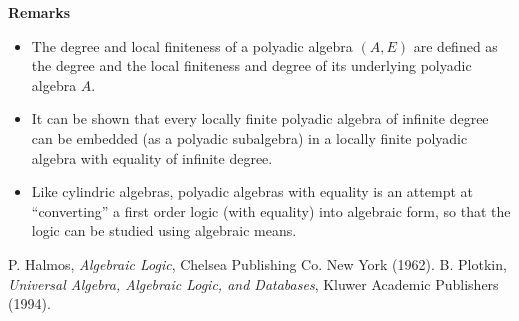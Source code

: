 \documentclass[12pt]{article}
\begin{document}
\textbf{Remarks}
\begin{itemize}
\item The degree and local finiteness of a polyadic algebra $(A,E)$ are defined as the degree and the local finiteness and degree of its underlying polyadic algebra $A$.
\item It can be shown that every locally finite polyadic algebra of infinite degree can be embedded (as a polyadic subalgebra) in a locally finite polyadic algebra with equality of infinite degree.
\item Like cylindric algebras, polyadic algebras with equality is an attempt at ``converting'' a first order logic (with equality) into algebraic form, so that the logic can be studied using algebraic means.
\end{itemize}

\begin{thebibliography}{8}
 P. Halmos, \emph{Algebraic Logic}, Chelsea Publishing Co. New York (1962).
 B. Plotkin, \emph{Universal Algebra, Algebraic Logic, and Databases}, Kluwer Academic Publishers (1994).
\end{thebibliography}
\end{document}
